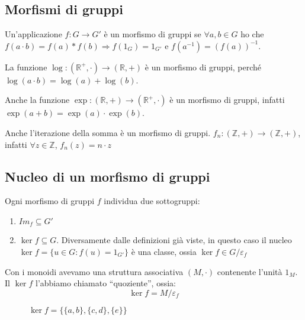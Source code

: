 \subsection{Morfismi di gruppi}

Un'applicazione $f : G \to G'$ \`e un morfismo di gruppi se $\forall a, b \in G$ ho che $f(a \cdot b) = f(a) \ast f(b) \Rightarrow f(1_G) = 1_{G'}$ e $f(a^{-1}) = (f(a))^{-1}$.

\begin{exmp} 
La funzione $\log : (\mathbb{R}^{+}, \cdot) \to (\mathbb{R}, +)$ \`e un morfismo di gruppi, perch\'e $\log(a \cdot b) = \log(a) + \log(b)$.

Anche la funzione $\exp : (\mathbb{R}, +) \to (\mathbb{R}^{+}, \cdot)$ \`e un morfismo di gruppi, infatti  $\exp(a + b) = \exp(a) \cdot \exp(b)$.

Anche l'iterazione della somma \`e un morfismo di gruppi. $f_n : (\mathbb{Z}, +) \to (\mathbb{Z}, +) $, infatti $\forall z \in \mathbb{Z}$, $f_n(z) = n \cdot z$
\end{exmp}

\subsection{Nucleo di un morfismo di gruppi}

Ogni morfismo di gruppi $f$ individua due sottogruppi:
\begin{enumerate}
    \item $Im_f \subseteq G'$
    \item $\ker f \subseteq G$. Diversamente dalle definizioni gi\`a viste, in questo caso il nucleo $\ker f = \{ u \in G : f(u) = 1_{G'}\}$ \`e una classe, ossia $\ker f \in G / \varepsilon_f$
\end{enumerate}

Con i monoidi avevamo una struttura associativa $(M, \cdot)$ contenente l'unit\`a $1_M$. Il $\ker f$ l'abbiamo chiamato ``quoziente'', ossia:
\[
\ker f = M / \varepsilon_f
\]

\begin{figure}[ht]
\centering
{}
\caption{\label{fig:esempio_funzione}$\ker f = \{ \{a, b \}, \{ c, d \}, \{ e \}\}$ }
\end{figure}

